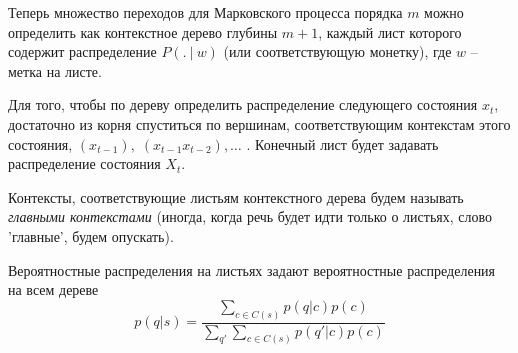 \documentclass{matmex-diploma-custom}
\begin{document}
Теперь множество переходов для Марковского процесса порядка $ m $ можно определить как контекстное дерево глубины $ m+1 $, каждый лист которого содержит распределение $P(.~|~w)$ (или соответствующую монетку), где $ w $ -- метка на листе.

Для того, чтобы по дереву определить распределение следующего состояния $ x_{t} $, достаточно из корня спуститься по вершинам, соответствующим контекстам этого состояния, $(x_{t-1}),\; (x_{t-1}x_{t-2}), \ldots$ . Конечный лист будет задавать распределение состояния $ X_{t} $.

Контексты, соответствующие листьям контекстного дерева будем называть \textit{главными контекстами} (иногда, когда речь будет идти только о листьях, слово 'главные', будем опускать).

\begin{remark}
Вероятностные распределения на листьях задают вероятностные распределения на всем дереве
$$ p(q|s) = \frac{\sum_{c \in C(s)} {p(q|c)p(c)}}{\sum_{q'}\sum_{c \in C(s)} {p(q'|c)p(c)}} $$ 
\end{remark}
\end{document}
